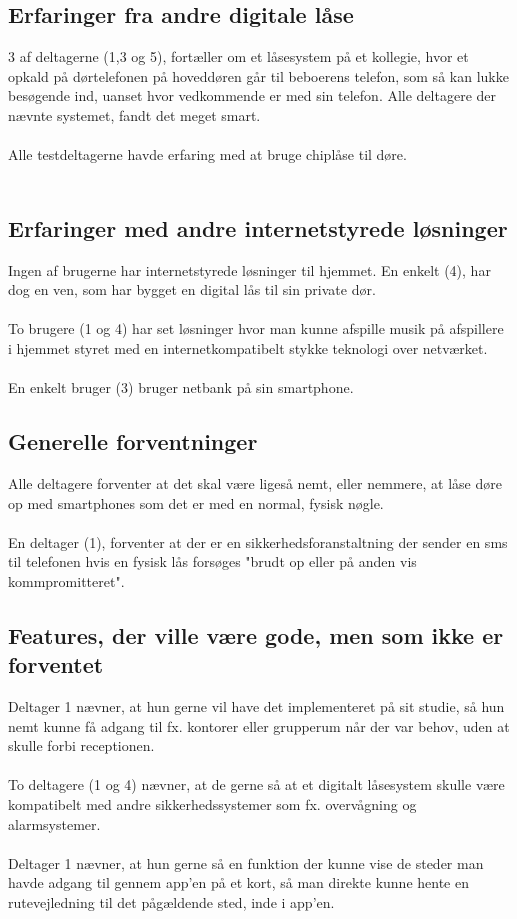 \documentclass[a4paper,12pt]{article}
\begin{document}
\subsection{Erfaringer fra andre digitale låse}

3 af deltagerne (1,3 og 5), fortæller om et låsesystem på et kollegie, hvor et opkald på dørtelefonen på hoveddøren går til beboerens telefon, som så kan lukke besøgende ind, uanset hvor vedkommende er med sin telefon.
Alle deltagere der nævnte systemet, fandt det meget smart.
\\ \\
Alle testdeltagerne havde erfaring med at bruge chiplåse til døre.
\\ \\



\subsection{Erfaringer med andre internetstyrede løsninger}
Ingen af brugerne har internetstyrede løsninger til hjemmet. En enkelt (4), har dog en ven, som har bygget en digital lås til sin private dør.
\\ \\
To brugere (1 og 4) har set løsninger hvor man kunne afspille musik på afspillere i hjemmet styret med en internetkompatibelt stykke teknologi over netværket.
\\ \\
En enkelt bruger (3) bruger netbank på sin smartphone. 

\subsection{Generelle forventninger}

Alle deltagere forventer at det skal være ligeså nemt, eller nemmere, at låse døre op med smartphones som det er med en normal, fysisk nøgle.
\\ \\
En deltager (1), forventer at der er en sikkerhedsforanstaltning der sender en sms til telefonen hvis en fysisk lås forsøges "brudt op eller på anden vis kommpromitteret".

\subsection{Features, der ville være gode, men som ikke er forventet}
Deltager 1 nævner, at hun gerne vil have det implementeret på sit studie, så hun nemt kunne få adgang til fx. kontorer eller grupperum når der var behov, uden at skulle forbi receptionen.
\\ \\
To deltagere (1 og 4) nævner, at de gerne så at et digitalt låsesystem skulle være kompatibelt med andre sikkerhedssystemer som fx. overvågning og alarmsystemer.
\\ \\
Deltager 1 nævner, at hun gerne så en funktion der kunne vise de steder man havde adgang til gennem app'en på et kort, så man direkte kunne hente en rutevejledning til det pågældende sted, inde i app'en.
\end{document}
